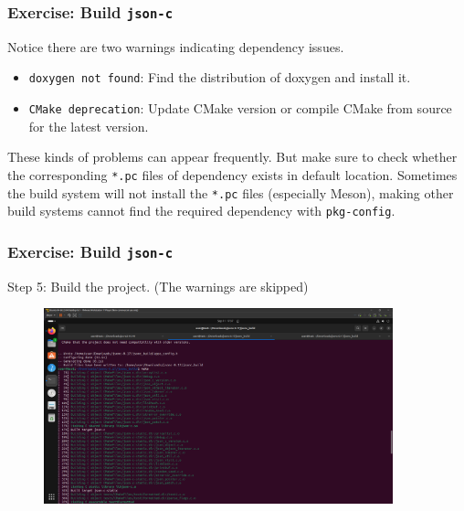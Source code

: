 \begin{frame}
    \frametitle{Exercise: Build \texttt{json-c}}

    Notice there are two warnings indicating dependency issues. 

    \begin{itemize}
        \item \alert{\texttt{doxygen not found}}: Find the distribution of doxygen and install it.
        \item \alert{\texttt{CMake deprecation}}: Update CMake version or compile CMake from source for the latest version.
    \end{itemize}

    These kinds of problems can appear frequently. But make sure to check whether the corresponding \texttt{*.pc} files of dependency exists in default location. Sometimes the build system will not install the \texttt{*.pc} files (especially Meson), making other build systems cannot find the required dependency with \alert{\texttt{pkg-config}}.
\end{frame}

\begin{frame}
    \frametitle{Exercise: Build \texttt{json-c}}

    Step 5: Build the project. (The warnings are skipped)

    \begin{figure}[H]
        \centering
        \includegraphics[width=0.9\textwidth]{../figure/jsonc_build_5.png}
    \end{figure}
\end{frame}

